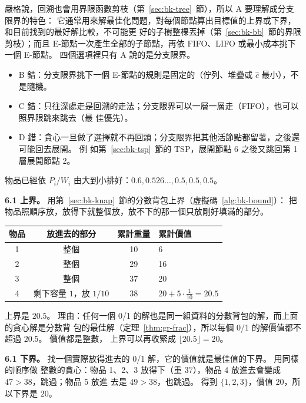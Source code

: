 嚴格說，回溯也會用界限函數剪枝（第~\ref{sec:bk-tree}~節），所以 A 要理解成分支限界的特色：
它通常用來解最佳化問題，對每個節點算出目標值的上界或下界，和目前找到的最好解比較，不可能更
好的子樹整棵丟掉（第~\ref{sec:bk-bb}~節的界限剪枝）；而且 E-節點一次產生全部的子節點，再依
FIFO、LIFO 或最小成本挑下一個 E-節點。 四個選項裡只有 A 說的是分支限界。

\begin{itemize}
\item B 錯：分支限界挑下一個 E-節點的規則是固定的（佇列、堆疊或 $\hat c$ 最小），不是隨機。
\item C 錯：只往深處走是回溯的走法；分支限界可以一層一層走（FIFO），也可以照界限跳來跳去（最
佳優先）。
\item D 錯：貪心一旦做了選擇就不再回頭；分支限界把其他活節點都留著，之後還可能回去展開。 例
如第~\ref{sec:bk-tsp}~節的 TSP，展開節點 6 之後又跳回第 1 層展開節點 2。
\end{itemize}

物品已經依 $P_i / W_i$ 由大到小排好：$0.6, 0.526\ldots, 0.5, 0.5, 0.5$。

\textbf{6.1 上界。} 用第~\ref{sec:bk-knap}~節的分數背包上界（虛擬碼~\ref{alg:bk-bound}）：
把物品照順序放，放得下就整個放，放不下的那一個只放剛好填滿的部分。

\begin{center}
\begin{tabular}{cccl}
\toprule
物品 & 放進去的部分 & 累計重量 & 累計價值 \\
\midrule
1 & 整個 & 10 & 6 \\
2 & 整個 & 29 & 16 \\
3 & 整個 & 37 & 20 \\
4 & 剩下容量 $1$，放 $1/10$ & 38 & $20 + 5 \cdot \frac{1}{10} = 20.5$ \\
\bottomrule
\end{tabular}
\end{center}

上界是 $20.5$。 理由：任何一個 0/1 的解也是同一組資料的分數背包的解，而上面的貪心解是分數背
包的最佳解（定理~\ref{thm:gr-frac}），所以每個 0/1 的解價值都不超過 $20.5$。 價值都是整數，
上界可以再收緊成 $\lfloor 20.5 \rfloor = 20$。

\textbf{6.1 下界。} 找一個實際放得進去的 0/1 解，它的價值就是最佳值的下界。 用同樣的順序做
整數的貪心：物品 1、2、3 放得下（重 $37$），物品 4 放進去會變成 $47 > 38$，跳過；物品 5 放進
去是 $49 > 38$，也跳過。 得到 $\{1, 2, 3\}$，價值 $20$，所以下界是 $20$。

